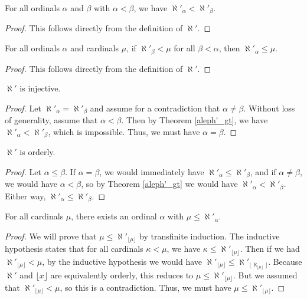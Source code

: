 \documentclass[../../math.tex]{subfiles}
\begin{document}
\begin{theorem} \label{aleph'_gt}
    For all ordinals $\alpha$ and $\beta$ with $\alpha < \beta$, we have
    $\aleph'_\alpha < \aleph'_\beta$.
\end{theorem}
\begin{proof}
    This follows directly from the definition of $\aleph'$.
\end{proof}

\begin{theorem} \label{aleph'_least}
    For all ordinals $\alpha$ and cardinals $\mu$, if $\aleph'_\beta < \mu$ for
    all $\beta < \alpha$, then $\aleph'_\alpha \leq \mu$.
\end{theorem}
\begin{proof}
    This follows directly from the definition of $\aleph'$.
\end{proof}

\begin{instance}
    $\aleph'$ is injective.
\end{instance}
\begin{proof}
    Let $\aleph'_\alpha = \aleph'_\beta$ and assume for a contradiction that
    $\alpha \neq \beta$.  Without loss of generality, assume that $\alpha <
    \beta$.  Then by Theorem \ref{aleph'_gt}, we have $\aleph'_\alpha <
    \aleph'_\beta$, which is impossible.  Thus, we must have $\alpha = \beta$.
\end{proof}

\begin{instance}
    $\aleph'$ is orderly.
\end{instance}
\begin{proof}
    Let $\alpha \leq \beta$.  If $\alpha = \beta$, we would immediately have
    $\aleph'_\alpha \leq \aleph'_\beta$, and if $\alpha \neq \beta$, we would
    have $\alpha < \beta$, so by Theorem \ref{aleph'_gt} we would have
    $\aleph'_\alpha < \aleph'_\beta$.  Either way, $\aleph'_\alpha \leq
    \aleph'_\beta$.
\end{proof}

\begin{lemma}
    For all cardinals $\mu$, there exists an ordinal $\alpha$ with $\mu \leq
    \aleph'_\alpha$.
\end{lemma}
\begin{proof}
    We will prove that $\mu \leq \aleph'_{\lfloor \mu \rfloor}$ by transfinite
    induction.  The inductive hypothesis states that for all cardinals $\kappa <
    \mu$, we have $\kappa \leq \aleph'_{\lfloor \mu \rfloor}$.  Then if we had
    $\aleph'_{\lfloor \mu \rfloor} < \mu$, by the inductive hypothesis we would
    have $\aleph'_{\lfloor \mu \rfloor} \leq \aleph'_{\lfloor \aleph_{\lfloor
    \mu \rfloor} \rfloor}$.  Because $\aleph'$ and $\lfloor x \rfloor$ are
    equivalently orderly, this reduces to $\mu \leq \aleph'_{\lfloor \mu
    \rfloor}$.  But we assumed that $\aleph'_{\lfloor \mu \rfloor} < \mu$, so
    this is a contradiction.  Thus, we must have $\mu \leq \aleph'_{\lfloor \mu
    \rfloor}$.
\end{proof}
\end{document}
